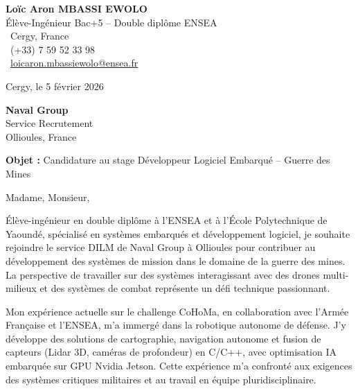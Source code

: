 \documentclass[a4paper,11pt]{article}
\begin{document}
\noindent
\begin{minipage}[t]{0.5\textwidth}
    \textbf{Loïc Aron MBASSI EWOLO}\\
    Élève-Ingénieur Bac+5 -- Double diplôme ENSEA\\[3pt]
    \faMapMarker\ Cergy, France\\
    \faPhone\ (+33) 7 59 52 33 98\\
    \faEnvelope\ \href{mailto:loicaron.mbassiewolo@ensea.fr}{loicaron.mbassiewolo@ensea.fr}
\end{minipage}
\hfill
\begin{minipage}[t]{0.4\textwidth}
    \raggedleft
    Cergy, le 5 février 2026
\end{minipage}

\vspace{1.2cm}

\hfill
\begin{minipage}[t]{0.5\textwidth}
    \raggedleft
    \textbf{Naval Group}\\
    Service Recrutement\\
    Ollioules, France
\end{minipage}

\vspace{1cm}

\noindent\textbf{Objet :} Candidature au stage Développeur Logiciel Embarqué -- Guerre des Mines

\vspace{0.8cm}

Madame, Monsieur,

Élève-ingénieur en double diplôme à l'ENSEA et à l'École Polytechnique de Yaoundé, spécialisé en systèmes embarqués et développement logiciel, je souhaite rejoindre le service DILM de Naval Group à Ollioules pour contribuer au développement des systèmes de mission dans le domaine de la guerre des mines. La perspective de travailler sur des systèmes interagissant avec des drones multi-milieux et des systèmes de combat représente un défi technique passionnant.

Mon expérience actuelle sur le challenge CoHoMa, en collaboration avec l'Armée Française et l'ENSEA, m'a immergé dans la robotique autonome de défense. J'y développe des solutions de cartographie, navigation autonome et fusion de capteurs (Lidar 3D, caméras de profondeur) en C/C++, avec optimisation IA embarquée sur GPU Nvidia Jetson. Cette expérience m'a confronté aux exigences des systèmes critiques militaires et au travail en équipe pluridisciplinaire.
\end{document}

